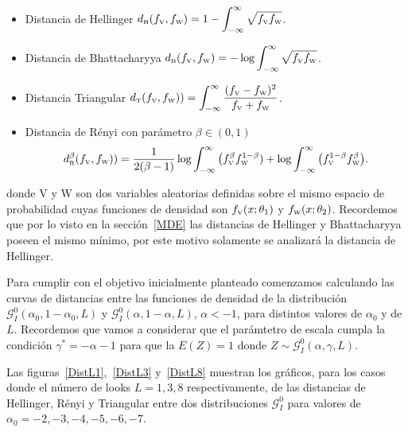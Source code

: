 \begin{itemize}
	\label{dist}
	\item Distancia de Hellinger $d_\text{\tiny H}(f_\text{\tiny V},f_\text{\tiny W})=1-\displaystyle{\int_{-\infty}^{\infty}\sqrt{f_\text{\tiny V} f_\text{\tiny W}}}$.
	
	\item Distancia de Bhattacharyya $d_\text{\tiny B}(f_\text{\tiny V},f_\text{\tiny W})=-\log\displaystyle{\int_{-\infty}^{\infty}\sqrt{f_\text{\tiny V} f_\text{\tiny W}}}$.
	
	\item Distancia Triangular $d_\text{\tiny T}(f_\text{\tiny V},f_\text{\tiny W}))=\displaystyle{\int_{-\infty}^{\infty}\frac{(f_\text{\tiny V}-f_\text{\tiny W})^2}{f_\text{\tiny V}+f_\text{\tiny W}}}$.
	
	\item Distancia de R\'enyi con parámetro $\beta\in(0,1)$
	$$
	d_\text{\tiny R}^{\beta}(f_\text{\tiny V},f_\text{\tiny W}))=\frac{1}{2(\beta-1)}\log\displaystyle{\int_{-\infty}^{\infty}\big({f_\text{\tiny V}^{\beta}f_\text{\tiny W}^{1-\beta})}+\log\displaystyle{\int_{-\infty}^{\infty}\big(f_\text{\tiny V}^{1-\beta}f_\text{\tiny W}^{\beta}}}\big).
	$$
\end{itemize}
donde V y W son  dos variables aleatorias definidas sobre el mismo espacio de probabilidad cuyas funciones de densidad son $f_\text{\tiny V}(x;\theta_1)$ y $f_\text{\tiny W}(x;\theta_2)$. 
Recordemos que por lo visto en la sección~\ref{MDE} las distancias de Hellinger y Bhattacharyya poseen el mismo mínimo, por este motivo solamente se analizará la distancia de Hellinger.  

Para cumplir con el objetivo inicialmente planteado comenzamos calculando las curvas de distancias entre las funciones de densidad de la distribución $\mathcal G_I^0(\alpha_0, 1-\alpha_0, L)$ y $\mathcal G_I^0(\alpha,1-\alpha,L)$, $\alpha<-1$, para distintos valores de $\alpha_0$ y de $L$. Recordemos que vamos a considerar que el parámtetro de escala cumpla la condición $\gamma^*=-\alpha-1$ para que la $E(Z)=1$ donde $Z \sim \mathcal{G}_I^0(\alpha,\gamma,L)$.

Las figuras~\ref{DistL1},~\ref{DistL3} y~\ref{DistL8} muestran los gráficos, para los casos donde el número de looks $L=1,3,8$ respectivamente, de las distancias de Hellinger, Rényi y Triangular entre dos distribuciones $\mathcal{G}_I^0$ para valores de $\alpha_0= -2,-3,-4,-5,-6,-7$. 

